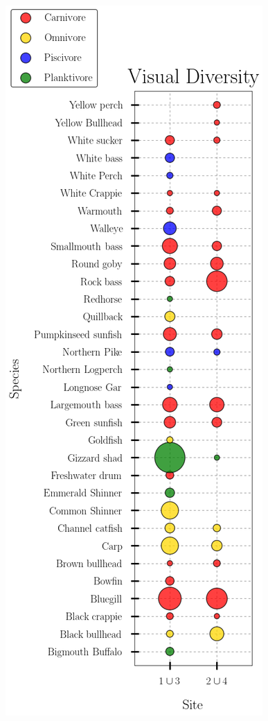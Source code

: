 \documentclass[b0paper,margin=1cm,landscape]{baposter}
\begin{document}
\begin{poster}
{\begin{center}
    \includegraphics[width=.8\textwidth]{Img/Diversity_Bubble_Plot.png} \\
  \end{center}
  
}
\end{poster}
\end{document}

